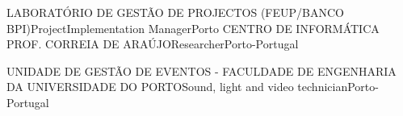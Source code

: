 

\begin{cventries}
  \cventry
{LABORATÓRIO DE GESTÃO DE PROJECTOS (FEUP/BANCO BPI)}{Project\/Implementation Manager}{Porto}{}
{}  \cventry
{CENTRO DE INFORMÁTICA PROF. CORREIA DE ARAÚJO}{Researcher}{Porto-Portugal}{{}}
{}\end{cventries}

\begin{cventries}
  \cventry
{UNIDADE DE GESTÃO DE EVENTOS - FACULDADE DE ENGENHARIA DA UNIVERSIDADE DO PORTO}{Sound, light and video technician}{Porto-Portugal}{{}}
{}\end{cventries}
